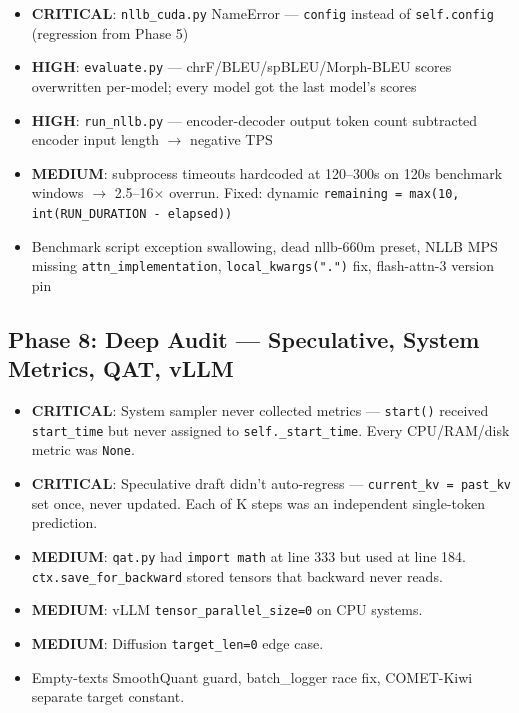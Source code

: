 \documentclass[11pt,a4paper,twoside]{article}
\begin{document}
\begin{itemize}[nosep]
  \item \textbf{CRITICAL}: \texttt{nllb\_cuda.py} NameError --- \texttt{config}
    instead of \texttt{self.config} (regression from Phase 5)
  \item \textbf{HIGH}: \texttt{evaluate.py} --- chrF/BLEU/spBLEU/Morph-BLEU scores
    overwritten per-model; every model got the last model's scores
  \item \textbf{HIGH}: \texttt{run\_nllb.py} --- encoder-decoder output token
    count subtracted encoder input length $\rightarrow$ negative TPS
  \item \textbf{MEDIUM}: subprocess timeouts hardcoded at 120--300s on 120s
    benchmark windows $\rightarrow$ 2.5--16$\times$ overrun. Fixed: dynamic
    \texttt{remaining = max(10, int(RUN\_DURATION - elapsed))}
  \item Benchmark script exception swallowing, dead nllb-660m preset,
    NLLB MPS missing \texttt{attn\_implementation}, \texttt{local\_kwargs(".")}
    fix, flash-attn-3 version pin
\end{itemize}

\subsection{Phase 8: Deep Audit --- Speculative, System Metrics, QAT, vLLM}

\begin{itemize}[nosep]
  \item \textbf{CRITICAL}: System sampler never collected metrics ---
    \texttt{start()} received \texttt{start\_time} but never assigned to
    \texttt{self.\_start\_time}. Every CPU/RAM/disk metric was \texttt{None}.
  \item \textbf{CRITICAL}: Speculative draft didn't auto-regress ---
    \texttt{current\_kv = past\_kv} set once, never updated. Each of K steps
    was an independent single-token prediction.
  \item \textbf{MEDIUM}: \texttt{qat.py} had \texttt{import math} at line 333
    but used at line 184. \texttt{ctx.save\_for\_backward} stored tensors that
    backward never reads.
  \item \textbf{MEDIUM}: vLLM \texttt{tensor\_parallel\_size=0} on CPU systems.
  \item \textbf{MEDIUM}: Diffusion \texttt{target\_len=0} edge case.
  \item Empty-texts SmoothQuant guard, batch\_logger race fix, COMET-Kiwi
    separate target constant.
\end{itemize}
\end{document}

